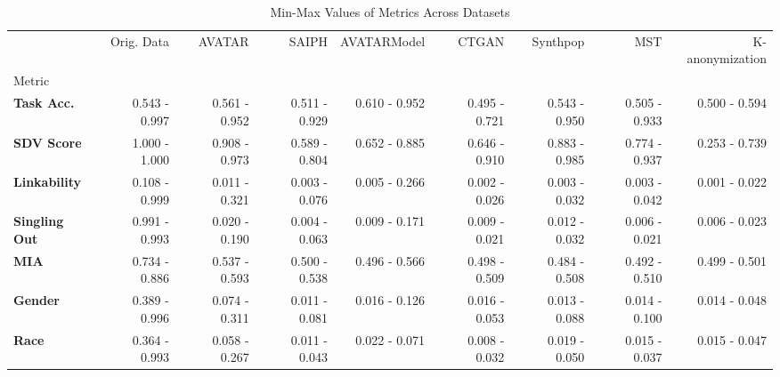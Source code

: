 \begin{table}
\caption{Min-Max Values of Metrics Across Datasets}
\label{tab:min_max_metrics}
\begin{tabular}{lrrrrrrrr}
\toprule
 & Orig. Data & AVATAR & SAIPH & AVATARModel & CTGAN & Synthpop & MST & K-anonymization \\
Metric &  &  &  &  &  &  &  &  \\
\midrule
\textbf{Task Acc.} & 0.543 - 0.997 & 0.561 - 0.952 & 0.511 - 0.929 & 0.610 - 0.952 & 0.495 - 0.721 & 0.543 - 0.950 & 0.505 - 0.933 & 0.500 - 0.594 \\
\textbf{SDV Score} & 1.000 - 1.000 & 0.908 - 0.973 & 0.589 - 0.804 & 0.652 - 0.885 & 0.646 - 0.910 & 0.883 - 0.985 & 0.774 - 0.937 & 0.253 - 0.739 \\
\textbf{Linkability} & 0.108 - 0.999 & 0.011 - 0.321 & 0.003 - 0.076 & 0.005 - 0.266 & 0.002 - 0.026 & 0.003 - 0.032 & 0.003 - 0.042 & 0.001 - 0.022 \\
\textbf{Singling Out} & 0.991 - 0.993 & 0.020 - 0.190 & 0.004 - 0.063 & 0.009 - 0.171 & 0.009 - 0.021 & 0.012 - 0.032 & 0.006 - 0.021 & 0.006 - 0.023 \\
\textbf{MIA} & 0.734 - 0.886 & 0.537 - 0.593 & 0.500 - 0.538 & 0.496 - 0.566 & 0.498 - 0.509 & 0.484 - 0.508 & 0.492 - 0.510 & 0.499 - 0.501 \\
\textbf{Gender} & 0.389 - 0.996 & 0.074 - 0.311 & 0.011 - 0.081 & 0.016 - 0.126 & 0.016 - 0.053 & 0.013 - 0.088 & 0.014 - 0.100 & 0.014 - 0.048 \\
\textbf{Race} & 0.364 - 0.993 & 0.058 - 0.267 & 0.011 - 0.043 & 0.022 - 0.071 & 0.008 - 0.032 & 0.019 - 0.050 & 0.015 - 0.037 & 0.015 - 0.047 \\
\bottomrule
\end{tabular}
\end{table}
